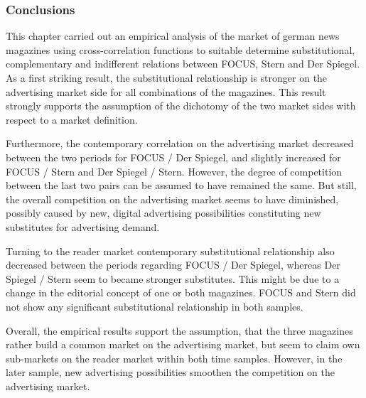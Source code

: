 \documentclass[12pt,a4paper]{scrreprt}
\begin{document}
 
\subsubsection{Conclusions}
This chapter carried out an empirical analysis of the market of german news magazines using cross-correlation functions to suitable determine substitutional, complementary and indifferent relations between FOCUS, Stern and Der Spiegel. As a first striking result, the substitutional relationship is stronger on the advertising market side for all combinations of the magazines. This result strongly supports the assumption of the dichotomy of the two market sides with respect to a market definition.  

Furthermore, the contemporary correlation on the advertising market decreased between the two periods for FOCUS / Der Spiegel, and slightly increased for FOCUS / Stern and Der Spiegel / Stern. However, the degree of competition between the last two pairs can be assumed to have remained the same. But still, the overall competition on the advertising market seems to have diminished, possibly caused by new, digital advertising possibilities constituting new substitutes for advertising demand. 

Turning to the reader market contemporary substitutional relationship also decreased between the periods regarding FOCUS / Der Spiegel, whereas Der Spiegel / Stern seem to became stronger substitutes. This might be due to a change in the editorial concept of one or both magazines. FOCUS and Stern did not show any significant substitutional relationship in both samples.  

Overall, the empirical results support the assumption, that the three magazines rather build a common market on the advertising market, but seem to claim own sub-markets on the reader market within both time samples. However, in the later sample, new advertising possibilities smoothen the competition on the advertising market. 
\end{document}
